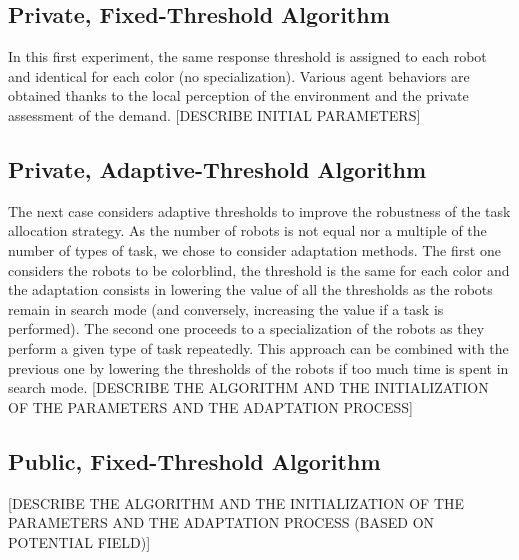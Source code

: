 \subsection{Private, Fixed-Threshold Algorithm}
In this first experiment, the same response threshold is assigned to each robot and identical for each color (no specialization). Various agent behaviors are obtained thanks to the local perception of the environment and the private assessment of the demand.
[DESCRIBE INITIAL PARAMETERS]
\subsection{Private, Adaptive-Threshold Algorithm}
The next case considers adaptive thresholds to improve the robustness of the task allocation strategy. As the number of robots is not equal nor a multiple of the number of types of task, we chose to consider adaptation methods. The first one considers the robots to be colorblind, the threshold is the same for each color and the adaptation consists in lowering the value of all the thresholds as the robots remain in search mode (and conversely, increasing the value if a task is performed). The second one proceeds to a specialization of the robots as they perform a given type of task repeatedly. This approach can be combined with the previous one by lowering the thresholds of the robots if too much time is spent in search mode.
[DESCRIBE THE ALGORITHM AND THE INITIALIZATION OF THE PARAMETERS AND THE ADAPTATION PROCESS]
\subsection{Public, Fixed-Threshold Algorithm}

[DESCRIBE THE ALGORITHM AND THE INITIALIZATION OF THE PARAMETERS AND THE ADAPTATION PROCESS (BASED ON POTENTIAL FIELD)]
